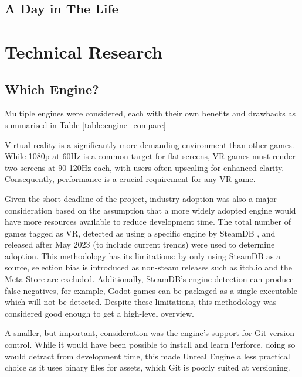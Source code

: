 \documentclass[12pt, a4paper]{report}
\begin{document}
\subsection{A Day in The Life}

\section{Technical Research}

\subsection{Which Engine?}

Multiple engines were considered, each with their own benefits
and drawbacks as summarised in Table \ref{table:engine_compare}

Virtual reality is a significantly more demanding environment than other games.
While 1080p at 60Hz is a common target for flat screens, VR games must render
two screens at 90-120Hz each, with users often upscaling for enhanced clarity.
Consequently, performance is a crucial requirement for any VR game.

Given the short deadline of the project, industry adoption was also a major
consideration based on the assumption that a more widely adopted engine would
have more resources available to reduce development time. The total number of
games tagged as VR, detected as using a specific engine by SteamDB
\cite{noauthor_steamdb_nodate}, and released
after May 2023 (to include current trends) were used to determine adoption.
This methodology has its limitations: by only using SteamDB as a source,
selection bias is introduced as non-steam releases such as itch.io and the Meta
Store are excluded. Additionally, SteamDB's engine detection can produce false
negatives, for example, Godot games can be packaged as a single executable which
will not be detected. Despite these limitations, this methodology was considered
good enough to get a high-level overview.

A smaller, but important, consideration was the engine's support for Git version
control. While it would have been possible to install and learn Perforce, doing
so would detract from development time, this made Unreal Engine a less practical
choice as it uses binary files for assets, which Git is poorly suited at
versioning.
\end{document}
